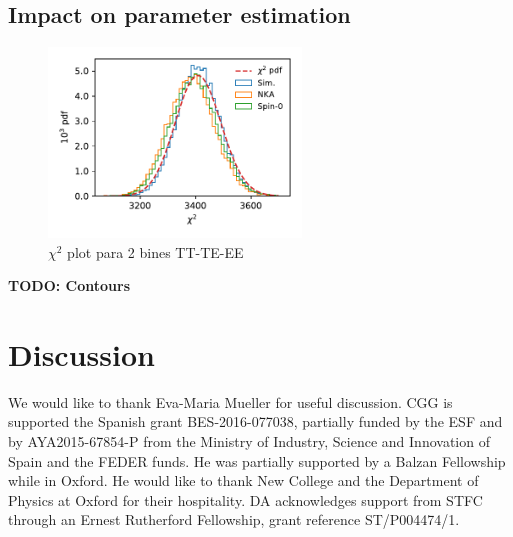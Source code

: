 \documentclass[a4paper,11pt]{article}
\newcommand{\todo}[1]{{\bf TODO: #1}}
\begin{document}
    \subsection{Impact on parameter estimation}\label{ssec:results.cosmo}
      \begin{figure}[htb]
        \centering
        \includegraphics[width=0.6\textwidth]{./figures/run_sph_2b_same_mask_Spin0_NKA_TTTEEE_Full_chi2.pdf}
        \caption{$\chi^2$ plot para 2 bines TT-TE-EE}
        \label{fig:chi2_2bins}
      \end{figure}

      \todo{Contours}

  \section{Discussion}\label{sec:discussion}


  \acknowledgments
  We would like to thank Eva-Maria Mueller for useful discussion. CGG is supported the Spanish grant BES-2016-077038, partially funded by the ESF and by AYA2015-67854-P from the Ministry of Industry, Science and Innovation of Spain and the FEDER funds. He was partially supported by a Balzan Fellowship while in Oxford. He would like to thank New College and the Department of Physics at Oxford for their hospitality. DA acknowledges support from STFC through an Ernest Rutherford Fellowship, grant reference ST/P004474/1.



  
  
  
  \appendix
\end{document}
